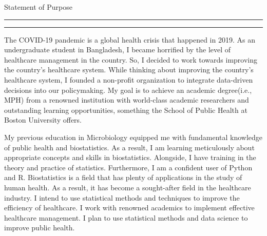 \documentclass[11pt, a4paper]{article}
\newcommand{\soptitle}{Statement of Purpose}
\begin{document}
\begin{center}\LARGE\soptitle\\
\end{center}
\hrule
\vspace{1pt}
\hrule height 1pt
\bigskip

\justify 
The COVID-19 pandemic is a global health crisis that happened in 2019. As an undergraduate student in Bangladesh, I became horrified by the level of healthcare management in the country. So, I decided to work towards improving the country's healthcare system. While thinking about improving the country's healthcare system, I founded a non-profit organization to integrate data-driven decisions into our policymaking. My goal is to achieve an academic degree(i.e., MPH) from a renowned institution with world-class academic researchers and outstanding learning opportunities, something the School of Public Health at Boston University offers. 

\justify 
My previous education in Microbiology equipped me with fundamental knowledge of public health and biostatistics. As a result, I am learning meticulously about appropriate concepts and skills in biostatistics. Alongside, I have training in the theory and practice of statistics. Furthermore, I am a confident user of Python and R. Biostatistics is a field that has plenty of applications in the study of human health. As a result, it has become a sought-after field in the healthcare industry. I intend to use statistical methods and techniques to improve the efficiency of healthcare. I work with renowned academics to implement effective healthcare management. I plan to use statistical methods and data science to improve public health.


\justify 
\end{document}

